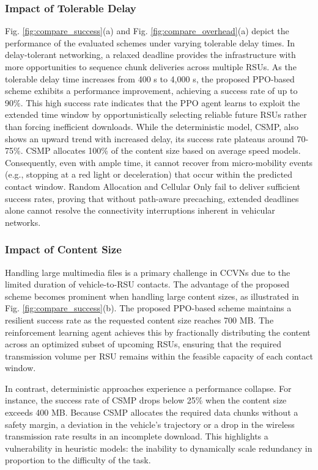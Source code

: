 \subsubsection{Impact of Tolerable Delay}
Fig. \ref{fig:compare_success}(a) and Fig. \ref{fig:compare_overhead}(a) depict the performance of the evaluated schemes under varying tolerable delay times. In delay-tolerant networking, a relaxed deadline provides the infrastructure with more opportunities to sequence chunk deliveries across multiple RSUs. As the tolerable delay time increases from 400 s to 4,000 s, the proposed PPO-based scheme exhibits a performance improvement, achieving a success rate of up to 90\%. This high success rate indicates that the PPO agent learns to exploit the extended time window by opportunistically selecting reliable future RSUs rather than forcing inefficient downloads.
While the deterministic model, CSMP, also shows an upward trend with increased delay, its success rate plateaus around 70-75\%. CSMP allocates 100\% of the content size based on average speed models. Consequently, even with ample time, it cannot recover from micro-mobility events (e.g., stopping at a red light or deceleration) that occur within the predicted contact window. Random Allocation and Cellular Only fail to deliver sufficient success rates, proving that without path-aware precaching, extended deadlines alone cannot resolve the connectivity interruptions inherent in vehicular networks.

\subsubsection{Impact of Content Size}
Handling large multimedia files is a primary challenge in CCVNs due to the limited duration of vehicle-to-RSU contacts. The advantage of the proposed scheme becomes prominent when handling large content sizes, as illustrated in Fig. \ref{fig:compare_success}(b). The proposed PPO-based scheme maintains a resilient success rate as the requested content size reaches 700 MB. The reinforcement learning agent achieves this by fractionally distributing the content across an optimized subset of upcoming RSUs, ensuring that the required transmission volume per RSU remains within the feasible capacity of each contact window.

In contrast, deterministic approaches experience a performance collapse. For instance, the success rate of CSMP drops below 25\% when the content size exceeds 400 MB. Because CSMP allocates the required data chunks without a safety margin, a deviation in the vehicle's trajectory or a drop in the wireless transmission rate results in an incomplete download. This highlights a vulnerability in heuristic models: the inability to dynamically scale redundancy in proportion to the difficulty of the task.


